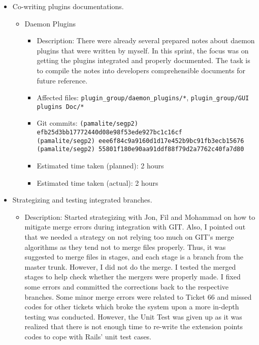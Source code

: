 \documentclass{article}
\begin{document}
\begin{itemize}
    \item Co-writing plugins documentations.
        \begin{itemize}
            \item Daemon Plugins
                \begin{itemize}
                    \item Description: There were already several prepared notes about daemon plugins that were written by myself. In this sprint, the focus was on getting the plugins integrated and properly documented. The task is to compile the notes into developers comprehensible documents for future reference. 
                    \item Affected files: \texttt{plugin\_group/daemon\_plugins/*}, \texttt{plugin\_group/GUI plugins Doc/*}
                    \item Git commits: \texttt{(pamalite/segp2) efb25d3bb17772440d08e98f53ede927bc1c16cf} \\
                        \texttt{(pamalite/segp2) eee6f84c9a9160d1d17e452b9bc91fb3ecb15676} \\
                        \texttt{(pamalite/segp2) 55801f180e90aa91ddf88f79d2a7762c40fa7d80} 
                    \item Estimated time taken (planned): 2 hours
                    \item Estimated time taken (actual): 2 hours
                \end{itemize}
        \end{itemize}
    \item Strategizing and testing integrated branches.
        \begin{itemize}
            \item Description: Started strategizing with Jon, Fil and Mohammad on how to mitigate merge errors during integration with GIT. Also, I pointed out that we needed a strategy on not relying too much on GIT's merge algorithms as they tend not to merge files properly. Thus, it was suggested to merge files in stages, and each stage is a branch from the master trunk. However, I did not do the merge. I tested the merged stages to help check whether the mergers were properly made. I fixed some errors and committed the corrections back to the respective branches. Some minor merge errors were related to Ticket 66 and missed codes for other tickets which broke the system upon a more in-depth testing was conducted. However, the Unit Test was given up as it was realized that there is not enough time to re-write the extension points codes to cope with Rails' unit test cases. 

\end{itemize}
\end{itemize}
\end{document}

